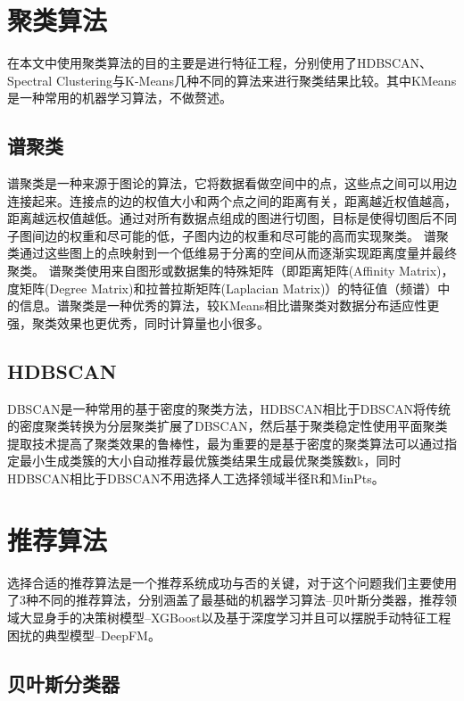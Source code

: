 \section{聚类算法}

在本文中使用聚类算法的目的主要是进行特征工程，分别使用了HDBSCAN、Spectral Clustering与K-Means几种不同的算法来进行聚类结果比较。其中KMeans是一种常用的机器学习算法，不做赘述。

\subsection{谱聚类}

谱聚类是一种来源于图论的算法，它将数据看做空间中的点，这些点之间可以用边连接起来。连接点的边的权值大小和两个点之间的距离有关，距离越近权值越高，距离越远权值越低。通过对所有数据点组成的图进行切图，目标是使得切图后不同子图间边的权重和尽可能的低，子图内边的权重和尽可能的高而实现聚类。
谱聚类通过这些图上的点映射到一个低维易于分离的空间从而逐渐实现距离度量并最终聚类。 谱聚类使用来自图形或数据集的特殊矩阵（即距离矩阵(Affinity Matrix)，度矩阵(Degree Matrix)和拉普拉斯矩阵(Laplacian Matrix)）的特征值（频谱）中的信息。谱聚类是一种优秀的算法，较KMeans相比谱聚类对数据分布适应性更强，聚类效果也更优秀，同时计算量也小很多。

\subsection{HDBSCAN}

DBSCAN是一种常用的基于密度的聚类方法，HDBSCAN相比于DBSCAN将传统的密度聚类转换为分层聚类扩展了DBSCAN，然后基于聚类稳定性使用平面聚类提取技术提高了聚类效果的鲁棒性，最为重要的是基于密度的聚类算法可以通过指定最小生成类簇的大小自动推荐最优簇类结果生成最优聚类簇数k，同时HDBSCAN相比于DBSCAN不用选择人工选择领域半径R和MinPts。

\section{推荐算法}

选择合适的推荐算法是一个推荐系统成功与否的关键，对于这个问题我们主要使用了3种不同的推荐算法，分别涵盖了最基础的机器学习算法--贝叶斯分类器，推荐领域大显身手的决策树模型--XGBoost以及基于深度学习并且可以摆脱手动特征工程困扰的典型模型--DeepFM。

\subsection{贝叶斯分类器}

